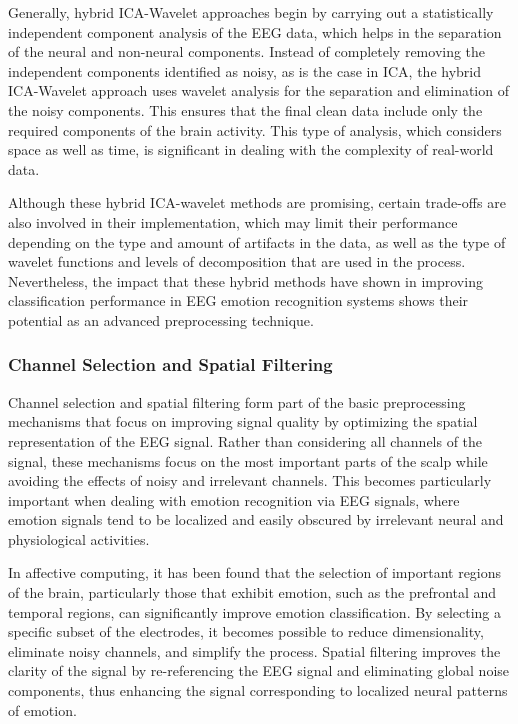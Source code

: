 \documentclass{WileyMSP-template}
\begin{document}
Generally, hybrid ICA-Wavelet approaches begin by carrying out a statistically independent component analysis of the EEG data, which helps in the separation of the neural and non-neural components. Instead of completely removing the independent components identified as noisy, as is the case in ICA, the hybrid ICA-Wavelet approach uses wavelet analysis for the separation and elimination of the noisy components. This ensures that the final clean data include only the required components of the brain activity. This type of analysis, which considers space as well as time, is significant in dealing with the complexity of real-world data.

Although these hybrid ICA-wavelet methods are promising, certain trade-offs are also involved in their implementation, which may limit their performance depending on the type and amount of artifacts in the data, as well as the type of wavelet functions and levels of decomposition that are used in the process. Nevertheless, the impact that these hybrid methods have shown in improving classification performance in EEG emotion recognition systems shows their potential as an advanced preprocessing technique.

\subsubsection{Channel Selection and Spatial Filtering}

Channel selection and spatial filtering form part of the basic preprocessing mechanisms that focus on improving signal quality by optimizing the spatial representation of the EEG signal. Rather than considering all channels of the signal, these mechanisms focus on the most important parts of the scalp while avoiding the effects of noisy and irrelevant channels. This becomes particularly important when dealing with emotion recognition via EEG signals, where emotion signals tend to be localized and easily obscured by irrelevant neural and physiological activities.

In affective computing, it has been found that the selection of important regions of the brain, particularly those that exhibit emotion, such as the prefrontal and temporal regions, can significantly improve emotion classification. By selecting a specific subset of the electrodes, it becomes possible to reduce dimensionality, eliminate noisy channels, and simplify the process. Spatial filtering improves the clarity of the signal by re-referencing the EEG signal and eliminating global noise components, thus enhancing the signal corresponding to localized neural patterns of emotion.
\end{document}
